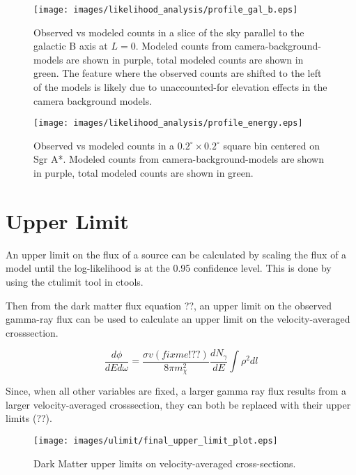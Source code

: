   \begin{figure}[ht]
    \begin{center}
      \texttt{[image: images/likelihood\_analysis/profile\_gal\_b.eps]}
      \caption[Galactic Center Profile vs Galactic B]{Observed vs modeled counts in a slice of the sky parallel to the galactic B axis at $L=0$.  Modeled counts from camera-background-models are shown in purple, total modeled counts are shown in green.  The feature where the observed counts are shifted to the left of the models is likely due to unaccounted-for elevation effects in the camera background models.}\label{fig:gc_profile_gal_b}
    \end{center}
  \end{figure}

  \begin{figure}[ht]
    \begin{center}
      \texttt{[image: images/likelihood\_analysis/profile\_energy.eps]}
      \caption[Galactic Center Profile vs Energy]{Observed vs modeled counts in a ${0.2}^{\circ}\times{0.2}^{\circ}$ square bin centered on Sgr A*.  Modeled counts from camera-background-models are shown in purple, total modeled counts are shown in green.}\label{fig:gc_profile_energy}
    \end{center}
  \end{figure}
  
  
\section{Upper Limit}
  An upper limit on the flux of a source can be calculated by scaling the flux of a model until the log-likelihood is at the 0.95 confidence level.
  This is done by using the ctulimit tool in ctools.
  
  Then from the dark matter flux equation ??, an upper limit on the observed gamma-ray flux can be used to calculate an upper limit on the velocity-averaged crosssection.
  
  \begin{equation}\label{eqn:ulim}
    \frac{d\phi}{dE d\omega} = \frac{ \sigma v (fixme!??)}{8\pi m_{\chi}^{2}} \frac{dN_{\gamma}}{dE} \int \rho^{2} dl
  \end{equation}
  
  Since, when all other variables are fixed, a larger gamma ray flux results from a larger velocity-averaged crosssection, they can both be replaced with their upper limits (??).

  \begin{figure}[ht]
    \begin{center}
      \texttt{[image: images/ulimit/final\_upper\_limit\_plot.eps]}
      \caption[Dark Matter Upper Limit Plot]{Dark Matter upper limits on velocity-averaged cross-sections.}\label{fig:ulim}
    \end{center}
  \end{figure}
  
  
